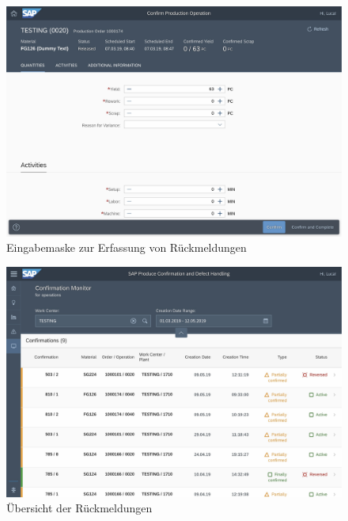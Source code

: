 \begin{figure}[H]
	\centering 
	\includegraphics[width=1.2\textwidth, angle =90 ]{img/confirm.jpg}	
	\caption[Eingabemaske zur Erfassung von Rückmeldungen]{\label{fig:Eingabemaske zur Erfassung von Rückmeldungen}Eingabemaske zur Erfassung von Rückmeldungen
	}
\end{figure}
\begin{figure}[H]
	\centering 
	\includegraphics[width=1.2\textwidth, angle =90 ]{img/confmonitor.jpg}	
	\caption[Übersicht der Rückmeldungen]{\label{fig:Überischt der Rückmeldungen}Übersicht der Rückmeldungen
	}
\end{figure}
